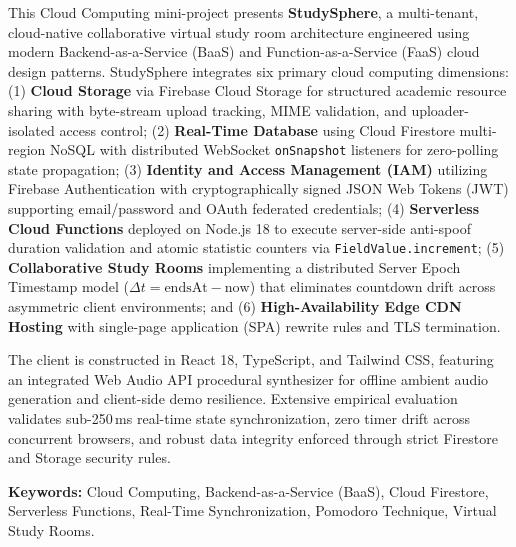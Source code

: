 \documentclass[12pt,a4paper,openany]{report}
\renewcommand{\baselinestretch}{1.3}
\begin{document}
This Cloud Computing mini-project presents \textbf{StudySphere}, a multi-tenant, cloud-native collaborative virtual study room architecture engineered using modern Backend-as-a-Service (BaaS) and Function-as-a-Service (FaaS) cloud design patterns. StudySphere integrates six primary cloud computing dimensions: (1) \textbf{Cloud Storage} via Firebase Cloud Storage for structured academic resource sharing with byte-stream upload tracking, MIME validation, and uploader-isolated access control; (2) \textbf{Real-Time Database} using Cloud Firestore multi-region NoSQL with distributed WebSocket \texttt{onSnapshot} listeners for zero-polling state propagation; (3) \textbf{Identity and Access Management (IAM)} utilizing Firebase Authentication with cryptographically signed JSON Web Tokens (JWT) supporting email/password and OAuth federated credentials; (4) \textbf{Serverless Cloud Functions} deployed on Node.js 18 to execute server-side anti-spoof duration validation and atomic statistic counters via \texttt{FieldValue.increment}; (5) \textbf{Collaborative Study Rooms} implementing a distributed Server Epoch Timestamp model ($\Delta t = \text{endsAt} - \text{now}$) that eliminates countdown drift across asymmetric client environments; and (6) \textbf{High-Availability Edge CDN Hosting} with single-page application (SPA) rewrite rules and TLS termination. 

The client is constructed in React 18, TypeScript, and Tailwind CSS, featuring an integrated Web Audio API procedural synthesizer for offline ambient audio generation and client-side demo resilience. Extensive empirical evaluation validates sub-250\,ms real-time state synchronization, zero timer drift across concurrent browsers, and robust data integrity enforced through strict Firestore and Storage security rules.

\vspace{0.5cm}
\noindent\textbf{Keywords:} Cloud Computing, Backend-as-a-Service (BaaS), Cloud Firestore, Serverless Functions, Real-Time Synchronization, Pomodoro Technique, Virtual Study Rooms.

\clearpage
\renewcommand{\baselinestretch}{1.2}\selectfont
\tableofcontents
\renewcommand{\baselinestretch}{1.3}\selectfont
 
\clearpage
\end{document}
